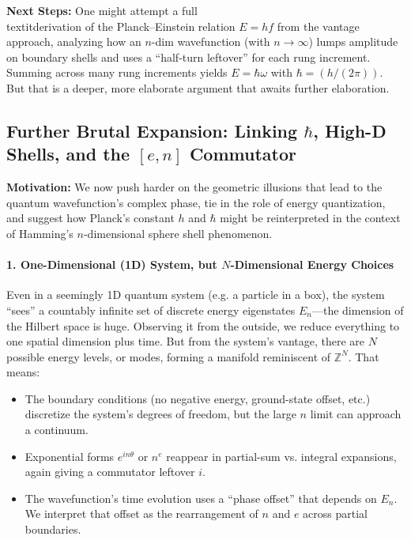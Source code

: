 \documentclass{article}
\begin{document}
\noindent\textbf{Next Steps:} One might attempt a full \\textit{derivation} of the Planck–Einstein relation $E=h f$ from the vantage approach, analyzing how an $n$-dim wavefunction (with $n\to\infty$) lumps amplitude on boundary shells and uses a “half-turn leftover” for each rung increment. Summing across many rung increments yields $E=\hbar\omega$ with $\hbar=(h/(2\pi))$. But that is a deeper, more elaborate argument that awaits further elaboration.








\subsection*{Further Brutal Expansion: Linking $\hbar$, High-D Shells, and the $[e,n]$ Commutator}

\noindent\textbf{Motivation:} We now push harder on the geometric illusions that lead to the quantum wavefunction’s complex phase, tie in the role of energy quantization, and suggest how Planck’s constant $h$ and $\hbar$ might be reinterpreted in the context of Hamming’s $n$-dimensional sphere shell phenomenon.

\paragraph{1. One-Dimensional (1D) System, but $N$-Dimensional Energy Choices}

Even in a seemingly 1D quantum system (e.g. a particle in a box), the system “sees” a countably infinite set of discrete energy eigenstates $E_n$—the dimension of the Hilbert space is huge. Observing it from the outside, we reduce everything to one spatial dimension plus time. But from the system’s vantage, there are $N$ possible energy levels, or modes, forming a manifold reminiscent of $\mathbb{Z}^N$. That means:
\begin{itemize}
\item The boundary conditions (no negative energy, ground-state offset, etc.) discretize the system’s degrees of freedom, but the large $n$ limit can approach a continuum.\vspace{-4pt}
\item Exponential forms $e^{in\theta}$ or $n^e$ reappear in partial-sum vs. integral expansions, again giving a commutator leftover $i$.\vspace{-4pt}
\item The wavefunction’s time evolution uses a “phase offset” that depends on $E_n$. We interpret that offset as the rearrangement of $n$ and $e$ across partial boundaries.
\end{itemize}
\end{document}
